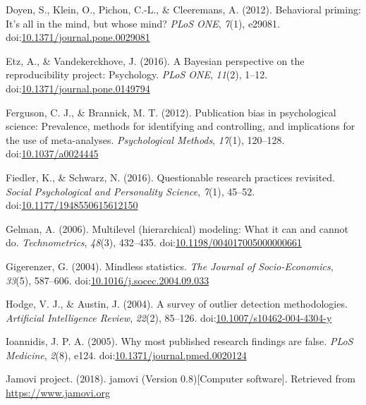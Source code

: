 \documentclass[english,,man,mask]{apa6}
\theoremstyle{definition}
\theoremstyle{definition}
\theoremstyle{definition}
\theoremstyle{remark}
\begin{document}
\hypertarget{ref-Doyen2012}{}
Doyen, S., Klein, O., Pichon, C.-L., \& Cleeremans, A. (2012).
Behavioral priming: It's all in the mind, but whose mind? \emph{PLoS
ONE}, \emph{7}(1), e29081.
doi:\href{https://doi.org/10.1371/journal.pone.0029081}{10.1371/journal.pone.0029081}

\hypertarget{ref-Etz2016}{}
Etz, A., \& Vandekerckhove, J. (2016). A Bayesian perspective on the
reproducibility project: Psychology. \emph{PLoS ONE}, \emph{11}(2),
1--12.
doi:\href{https://doi.org/10.1371/journal.pone.0149794}{10.1371/journal.pone.0149794}

\hypertarget{ref-Ferguson2012a}{}
Ferguson, C. J., \& Brannick, M. T. (2012). Publication bias in
psychological science: Prevalence, methods for identifying and
controlling, and implications for the use of meta-analyses.
\emph{Psychological Methods}, \emph{17}(1), 120--128.
doi:\href{https://doi.org/10.1037/a0024445}{10.1037/a0024445}

\hypertarget{ref-Fiedler2016}{}
Fiedler, K., \& Schwarz, N. (2016). Questionable research practices
revisited. \emph{Social Psychological and Personality Science},
\emph{7}(1), 45--52.
doi:\href{https://doi.org/10.1177/1948550615612150}{10.1177/1948550615612150}

\hypertarget{ref-Gelman2006}{}
Gelman, A. (2006). Multilevel (hierarchical) modeling: What it can and
cannot do. \emph{Technometrics}, \emph{48}(3), 432--435.
doi:\href{https://doi.org/10.1198/004017005000000661}{10.1198/004017005000000661}

\hypertarget{ref-Gigerenzer2004}{}
Gigerenzer, G. (2004). Mindless statistics. \emph{The Journal of
Socio-Economics}, \emph{33}(5), 587--606.
doi:\href{https://doi.org/10.1016/j.socec.2004.09.033}{10.1016/j.socec.2004.09.033}

\hypertarget{ref-Hodge2004}{}
Hodge, V. J., \& Austin, J. (2004). A survey of outlier detection
methodologies. \emph{Artificial Intelligence Review}, \emph{22}(2),
85--126.
doi:\href{https://doi.org/10.1007/s10462-004-4304-y}{10.1007/s10462-004-4304-y}

\hypertarget{ref-Ioannidis2005}{}
Ioannidis, J. P. A. (2005). Why most published research findings are
false. \emph{PLoS Medicine}, \emph{2}(8), e124.
doi:\href{https://doi.org/10.1371/journal.pmed.0020124}{10.1371/journal.pmed.0020124}

\hypertarget{ref-jamovi2018}{}
Jamovi project. (2018). jamovi (Version 0.8){[}Computer software{]}.
Retrieved from \url{https://www.jamovi.org}
\end{document}
